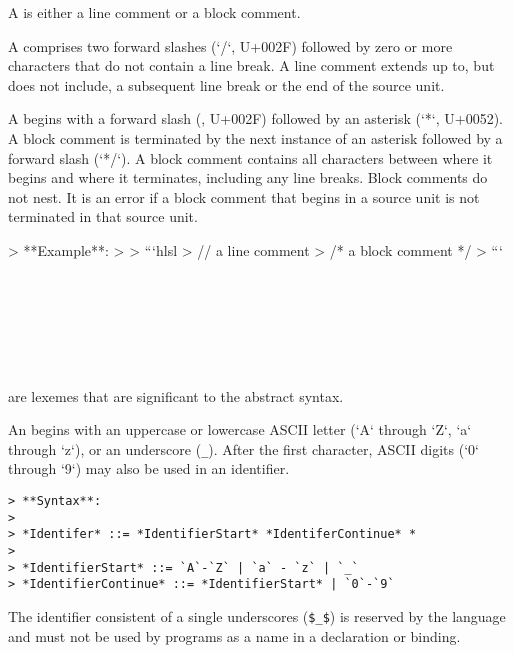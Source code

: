 
A  is either a line comment or a block comment.

A  comprises two forward slashes (`/`, U+002F) followed by zero or more characters that do not contain a line break.
A line comment extends up to, but does not include, a subsequent line break or the end of the source unit.

A  begins with a forward slash (\Char{/}, U+002F) followed by an asterisk (`*`, U+0052). 
A block comment is terminated by the next instance of an asterisk followed by a forward slash (`*/`).
A block comment contains all characters between where it begins and where it terminates, including any line breaks.
Block comments do not nest.
It is an error if a block comment that begins in a source unit is not terminated in that source unit.

> **Example**:
>
> ```hlsl
> // a line comment
> /* a block comment */
> ```


\begin{Lexical}
     \\
         \\
    \SynOr {} \\
    \SynOr {} \\
    \SynOr {} \\
\end{Lexical}

 are lexemes that are significant to the abstract syntax.


An  begins with an uppercase or lowercase ASCII letter (`A` through `Z`, `a` through `z`), or an underscore (\lstinline{_}).
After the first character, ASCII digits (`0` through `9`) may also be used in an identifier.

\begin{verbatim}
> **Syntax**:
>
> *Identifer* ::= *IdentifierStart* *IdentiferContinue* *
>
> *IdentifierStart* ::= `A`-`Z` | `a` - `z` | `_`
> *IdentifierContinue* ::= *IdentifierStart* | `0`-`9`        
\end{verbatim}

The identifier consistent of a single underscores (\lstinline|$_$|) is reserved by the language and must not be used by programs as a name in a declaration or binding.

